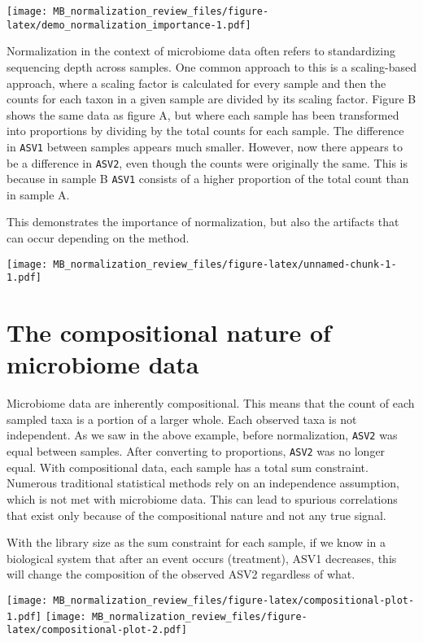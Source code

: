 \documentclass[
]{book}
\begin{document}
\texttt{[image: MB\_normalization\_review\_files/figure-latex/demo\_normalization\_importance-1.pdf]}

Normalization in the context of microbiome data often refers to standardizing sequencing depth across samples. One common approach to this is a scaling-based approach, where a scaling factor is calculated for every sample and then the counts for each taxon in a given sample are divided by its scaling factor. Figure B shows the same data as figure A, but where each sample has been transformed into proportions by dividing by the total counts for each sample. The difference in \texttt{ASV1} between samples appears much smaller. However, now there appears to be a difference in \texttt{ASV2}, even though the counts were originally the same. This is because in sample B \texttt{ASV1} consists of a higher proportion of the total count than in sample A.

This demonstrates the importance of normalization, but also the artifacts that can occur depending on the method.

\texttt{[image: MB\_normalization\_review\_files/figure-latex/unnamed-chunk-1-1.pdf]}

\hypertarget{the-compositional-nature-of-microbiome-data}{%
\section{The compositional nature of microbiome data}\label{the-compositional-nature-of-microbiome-data}}

Microbiome data are inherently compositional. This means that the count of each sampled taxa is a portion of a larger whole. Each observed taxa is not independent. As we saw in the above example, before normalization, \texttt{ASV2} was equal between samples. After converting to proportions, \texttt{ASV2} was no longer equal. With compositional data, each sample has a total sum constraint. Numerous traditional statistical methods rely on an independence assumption, which is not met with microbiome data. This can lead to spurious correlations that exist only because of the compositional nature and not any true signal.

With the library size as the sum constraint for each sample, if we know in a biological system that after an event occurs (treatment), ASV1 decreases, this will change the composition of the observed ASV2 regardless of what.

\texttt{[image: MB\_normalization\_review\_files/figure-latex/compositional-plot-1.pdf]} \texttt{[image: MB\_normalization\_review\_files/figure-latex/compositional-plot-2.pdf]}
\end{document}
